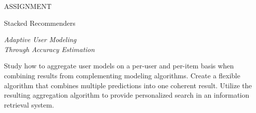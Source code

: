 \null\vspace{6em}

{
  \centering
  \color{gray}
  ASSIGNMENT
  \color{black}
  \vspace{1em}
  
  \LARGE{Stacked Recommenders}\\
  \vspace{1em}
  
  \itshape
  \large{Adaptive User Modeling}\\
  \large{Through Accuracy Estimation}\\
}

\vspace{3em}

Study how to aggregate user models on a per-user and per-item
basis when combining results from complementing modeling algorithms.
Create a flexible algorithm that combines multiple predictions
into one coherent result.
Utilize the resulting aggregation algorithm
to provide personalized search in an information retrieval system.

\vfill

